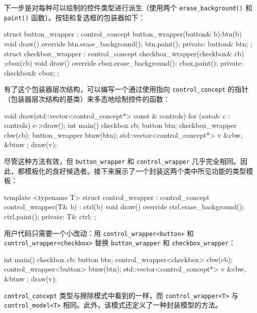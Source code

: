 下一步是对每种可以绘制的控件类型进行派生（使用两个 \verb|erase_background()| 和 \verb|paint()| 函数）。按钮和复选框的包装器如下：

\begin{cpp}
struct button_wrapper : control_concept
{
    button_wrapper(button& b):btn(b)
    {}
    void draw() override
    {
        btn.erase_background();
        btn.paint();
    }
    private:
    button& btn;
};
struct checkbox_wrapper : control_concept
{
    checkbox_wrapper(checkbox& cb) :cbox(cb)
    {}
    void draw() override
    {
        cbox.erase_background();
        cbox.paint();
    }
    private:
    checkbox& cbox;
};
\end{cpp}

有了这个包装器层次结构，可以编写一个通过使用指向 \verb|control_concept| 的指针（包装器层次结构的基类）来多态地绘制控件的函数：

\begin{cpp}
void draw(std::vector<control_concept*> const & controls)
{
    for (auto& c : controls)
    c->draw();
}
int main()
{
    checkbox cb;
    button btn;
    checkbox_wrapper cbw(cb);
    button_wrapper btnw(btn);
    std::vector<control_concept*> v{ &cbw, &btnw };
    draw(v);
}
\end{cpp}

尽管这种方法有效，但 \verb|button_wrapper| 和 \verb|control_wrapper| 几乎完全相同。因此，都模板化的良好候选者。接下来展示了一个封装这两个类中所见功能的类型模板：

\begin{cpp}
template <typename T>
struct control_wrapper : control_concept
{
    control_wrapper(T& b) : ctrl(b)
    {}
    void draw() override
    {
        ctrl.erase_background();
        ctrl.paint();
    }
private:
    T& ctrl;
};
\end{cpp}

用户代码只需要一个小改动：用 \verb|control_wrapper<button>| 和 \verb|control_wrapper<checkbox>| 替换 \verb|button_wrapper| 和 \verb|checkbox_wrapper|：

\begin{cpp}
int main()
{
    checkbox cb;
    button btn;
    control_wrapper<checkbox> cbw(cb);
    control_wrapper<button> btnw(btn);
    std::vector<control_concept*> v{ &cbw, &btnw };
    draw(v);
}
\end{cpp}

\verb|control_concept| 类型与擦除模式中看到的一样，而 \verb|control_wrapper<T>| 与 \verb|control_model<T>| 相同。此外，该模式还定义了一种封装模型的方法。

